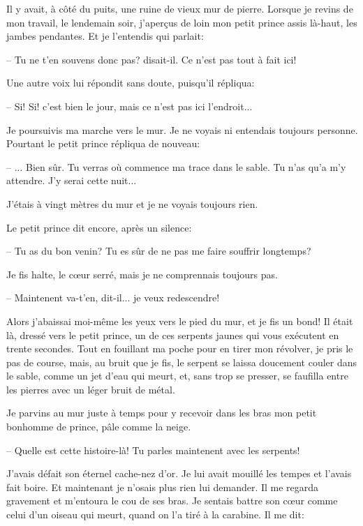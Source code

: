 \documentclass[a4paper]{report}
\begin{document}
\parachapter{} %
Il y avait, à côté du puits, une ruine de vieux mur de pierre. Lorsque je revins de mon travail, le lendemain soir, j'aperçus de loin mon petit prince assis là-haut, les jambes pendantes. Et je l'entendis qui parlait:

-- Tu ne t'en souvens donc pas? disait-il. Ce n'est pas tout à fait ici!

Une autre voix lui répondit sans doute, puisqu'il répliqua:

-- Si! Si! c'est bien le jour, mais ce n'est pas ici l'endroit...

Je poursuivis ma marche vers le mur. Je ne voyais ni entendais toujours personne. Pourtant le petit prince répliqua de nouveau:

-- ... Bien sûr. Tu verras où commence ma trace dans le sable. Tu n'as qu'a m'y attendre. J'y serai cette nuit...

J'étais à vingt mètres du mur et je ne voyais toujours rien.

Le petit prince dit encore, après un silence:

-- Tu as du bon venin? Tu es sûr de ne pas me faire souffrir longtemps?

Je fis halte, le cœur serré, mais je ne comprennais toujours pas.

-- Maintenent va-t'en, dit-il... je veux redescendre! 


Alors j'abaissai moi-même les yeux vers le pied du mur, et je fis un bond! Il était là, dressé vers le petit prince, un de ces serpents jaunes qui vous exécutent en trente secondes. Tout en fouillant ma poche pour en tirer mon révolver, je pris le pas de course, mais, au bruit que je fis, le serpent se laissa doucement couler dans le sable, comme un jet d'eau qui meurt, et, sans trop se presser, se faufilla entre les pierres avec un léger bruit de métal.

Je parvins au mur juste à temps pour y recevoir dans les bras mon petit bonhomme de prince, pâle comme la neige.

-- Quelle est cette histoire-là! Tu parles maintenent avec les serpents!

J'avais défait son éternel cache-nez d'or. Je lui avait mouillé les tempes et l'avais fait boire. Et maintenant je n'osais plus rien lui demander. Il me regarda gravement et m'entoura le cou de ses bras. Je sentais battre son cœur comme celui d'un oiseau qui meurt, quand on l'a tiré à la carabine. Il me dit:
\end{document}
